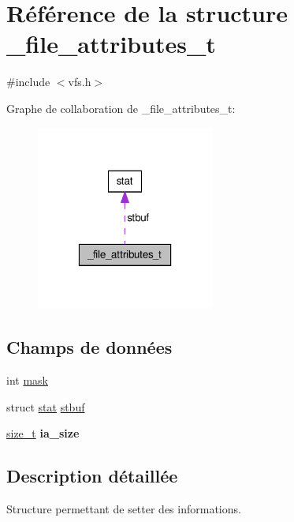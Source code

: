 \hypertarget{struct__file__attributes__t}{\section{Référence de la structure \-\_\-file\-\_\-attributes\-\_\-t}
\label{struct__file__attributes__t}
}


{\ttfamily \#include $<$vfs.\-h$>$}



Graphe de collaboration de \-\_\-file\-\_\-attributes\-\_\-t\-:\nopagebreak
\begin{figure}[H]
\begin{center}
\leavevmode
\includegraphics[width=166pt]{struct__file__attributes__t__coll__graph}
\end{center}
\end{figure}
\subsection*{Champs de données}
\begin{DoxyCompactItemize}
\item 
int \hyperlink{struct__file__attributes__t_a51072887a2d07ba9e5566cef453c3707}{mask}
\item 
struct \hyperlink{structstat}{stat} \hyperlink{struct__file__attributes__t_aa42b25ef9e64509420c287ab6b60c8a8}{stbuf}
\item 
\hypertarget{struct__file__attributes__t_ae1424de59c1c74710ce2cc66ce03a3af}{\hyperlink{types_8h_a29d85914ddff32967d85ada69854206d}{size\-\_\-t} {\bfseries ia\-\_\-size}}\label{struct__file__attributes__t_ae1424de59c1c74710ce2cc66ce03a3af}

\end{DoxyCompactItemize}


\subsection{Description détaillée}
Structure permettant de setter des informations. 

